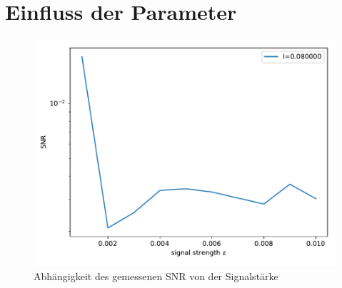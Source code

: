 \documentclass[12pt,a4paper]{article}
\begin{document}
\section{Einfluss der Parameter}
\begin{figure}[H]
	\centering
	\includegraphics[scale=0.9]{snrepsautorealdrange6aem2.pdf}
	\caption{Abhängigkeit des gemessenen SNR von der Signalstärke}
	\label{eps}
\end{figure}
\end{document}
